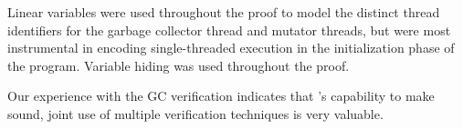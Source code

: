 Linear variables were used throughout the proof to model the distinct
thread identifiers for the garbage collector thread and mutator
threads, but were most instrumental in encoding single-threaded
execution in the initialization phase of the program.  
Variable hiding was used throughout the proof. 

Our experience with the GC verification indicates that 
\civl's capability to make sound, joint use of multiple verification
techniques is very valuable. 

